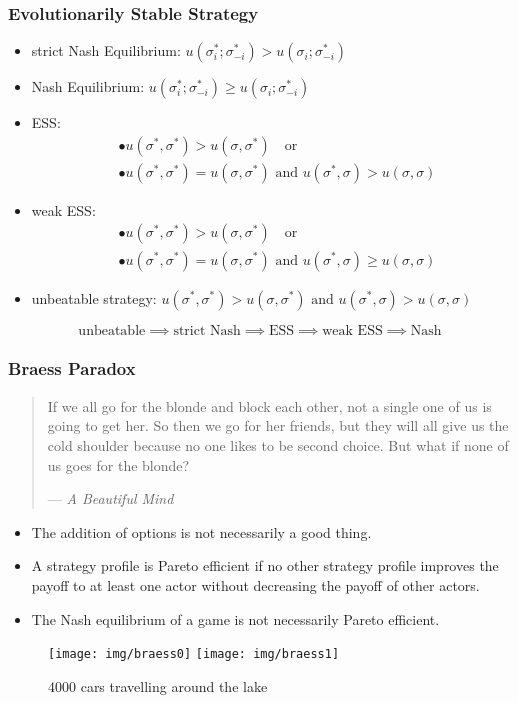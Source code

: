 \documentclass[UTF8,11pt,colorlinks,compress,openany]{beamer}%
\begin{document}
\begin{frame}\frametitle{Evolutionarily Stable Strategy}
\begin{itemize}
	\item strict Nash Equilibrium: $u(\sigma_i^*;\sigma_{-i}^*)>u(\sigma_i;\sigma_{-i}^*)$
	\item Nash Equilibrium: $u(\sigma_i^*;\sigma_{-i}^*)\geq u(\sigma_i;\sigma_{-i}^*)$
	\item ESS:
	\begin{align*}
	&\bullet u\left(\sigma^*,\sigma^*\right)>u\left(\sigma,\sigma^*\right)\quad\mbox{or}\\
	&\bullet u\left(\sigma^*,\sigma^*\right)=u\left(\sigma,\sigma^*\right)\mbox{ and } u\left(\sigma^*,\sigma\right)>u\left(\sigma,\sigma\right)
	\end{align*}
	\item weak ESS:
	\begin{align*}
	&\bullet u\left(\sigma^*,\sigma^*\right)>u\left(\sigma,\sigma^*\right)\quad\mbox{or}\\
	&\bullet u\left(\sigma^*,\sigma^*\right)=u\left(\sigma,\sigma^*\right)\mbox{ and } u\left(\sigma^*,\sigma\right)\geq u\left(\sigma,\sigma\right)
	\end{align*}
	\item unbeatable strategy:
	$u\left(\sigma^*,\sigma^*\right)>u\left(\sigma,\sigma^*\right)\mbox{ and } u\left(\sigma^*,\sigma\right)>u\left(\sigma,\sigma\right)$
\end{itemize}
\[\mbox{unbeatable}\implies\mbox{strict Nash}\implies\mbox{ESS}\implies\mbox{weak ESS}\implies\mbox{Nash}\]
\end{frame}

\begin{frame}\frametitle{Braess Paradox}
\begin{quote}
If we all go for the blonde and block each other, not a single one of us is going to get her. So then we go for her friends, but they will all give us the cold shoulder because no one likes to be second choice. But what if none of us goes for the blonde?\par\hfill --- \textsl{A Beautiful Mind}
\end{quote}\vspace{-4pt}
\begin{itemize}
	\item The addition of options is not necessarily a good thing.
	\item A strategy profile is Pareto efficient if no other strategy profile improves the payoff to at least one actor without decreasing the payoff of other actors.
	\item The Nash equilibrium of a game is not necessarily Pareto efficient.
\end{itemize}
\begin{figure}
	\texttt{[image: img/braess0]}
	\texttt{[image: img/braess1]}\vspace{-9pt}\caption{$4000$ cars travelling around the lake}
\end{figure}
\end{frame}
\end{document}
